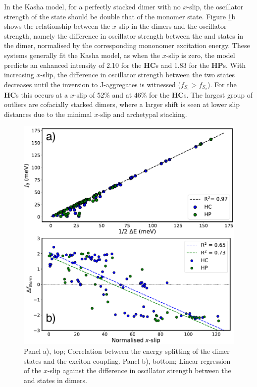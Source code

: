 In the Kasha model, for a perfectly stacked dimer with no $x$-slip, the oscillator strength of the \stwo{} state should be double that of the monomer state. Figure \ref{figure: dimer_regressions}b shows the relationship between the $x$-slip in the dimers and the oscillator strength, namely the difference in oscillator strength between the \stwo{} and \sone{} states in the dimer, normalised by the corresponding mononomer excitation energy. These systems generally fit the Kasha model, as when the $x$-slip is zero, the model predicts an enhanced \stwo{} intensity of 2.10 for the \textbf{HC}s and 1.83 for the \textbf{HP}s. With increasing $x$-slip, the difference in oscillator strength between the two states decreases until the inversion to J-aggregates is witnessed ($f_{S_{1}}>f_{S_{2}}$). For the \textbf{HC}s this occurs at a $x$-slip of 52\% and at 46\% for the \textbf{HC}s. The largest group of outliers are cofacially stacked dimers, where a larger shift is seen at lower slip distances due to the minimal $x$-slip and archetypal stacking.\cite{Gierschner2016} 
\begin{figure}[t]
\centering
  \includegraphics[width=0.8\linewidth]{5ConnectingCrystalStructure/dimer_regressions.pdf}
  \caption[Correlation between the energy splitting and exciton coupling]{Panel a), top; Correlation between the energy splitting of the dimer states and the exciton coupling. Panel b), bottom; Linear regression of the $x$-slip against the difference in oscillator strength between the \stwo{} and \sone{} states in dimers.}
  \label{figure: dimer_regressions}
\end{figure}

